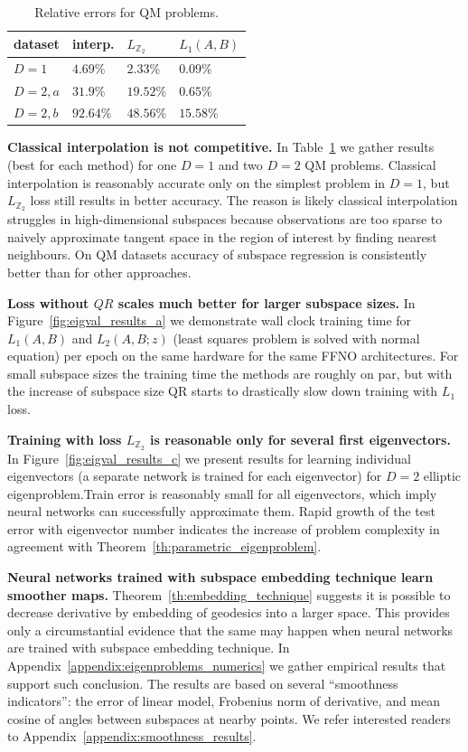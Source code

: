 \documentclass{article}
\begin{document}
\begin{table}
\caption{Relative errors for QM problems.}
\label{table:QM_summary}
\begin{tabular}{llll}
\toprule
dataset & interp. & $L_{\mathbb{Z}_2}$ & $L_1(A, B)$ \\
\midrule
$D=1$ & $4.69\%$ & $2.33\%$ & $0.09\%$ \\
$D=2, a$ & $31.9\%$ & $19.52\%$ & $0.65\%$ \\
$D=2, b$  & $92.64\%$ & $48.56\%$ & $15.58\%$ \\
\bottomrule
\end{tabular}
\end{table} 

\textbf{Classical interpolation is not competitive.}  In Table~\ref{table:QM_summary} we gather results (best for each method) for one $D=1$ and two $D=2$ QM problems. Classical interpolation is reasonably accurate only on the simplest problem in $D=1$, but $L_{\mathbb{Z}_2}$ loss still results in better accuracy. The reason is likely classical interpolation struggles in high-dimensional subspaces because observations are too sparse to naively approximate tangent space in the region of interest by finding nearest neighbours. On QM datasets accuracy of subspace regression is consistently better than for other approaches.

\textbf{Loss without $QR$ scales much better for larger subspace sizes.} In Figure~\ref{fig:eigval_results_a} we demonstrate wall clock training time for $L_1(A, B)$ and $L_2(A, B;z)$ (least squares problem is solved with normal equation) per epoch on the same hardware for the same FFNO architectures. For small subspace sizes the training time the methods are roughly on par, but with the increase of subspace size QR starts to drastically slow down training with $L_1$ loss.

\textbf{Training with loss $L_{\mathbb{Z}_2}$ is reasonable only for several first eigenvectors.} In Figure~\ref{fig:eigval_results_c} we present results for learning individual eigenvectors (a separate network is trained for each eigenvector) for $D=2$ elliptic eigenproblem.Train error is reasonably small for all eigenvectors, which imply neural networks can successfully approximate them. Rapid growth of the test error with eigenvector number indicates the increase of problem complexity in agreement with Theorem~\ref{th:parametric_eigenproblem}.

\textbf{Neural networks trained with subspace embedding technique learn smoother maps.} Theorem~\ref{th:embedding_technique} suggests it is possible to decrease derivative by embedding of geodesics into a larger space. This provides only a circumstantial evidence that the same may happen when neural networks are trained with subspace embedding technique. In Appendix~\ref{appendix:eigenproblems_numerics} we gather empirical results that support such conclusion. The results are based on several ``smoothness indicators'': the error of linear model, Frobenius norm of derivative, and mean cosine of angles between subspaces at nearby points. We refer interested readers to Appendix~\ref{appendix:smoothness_results}.
\end{document}
